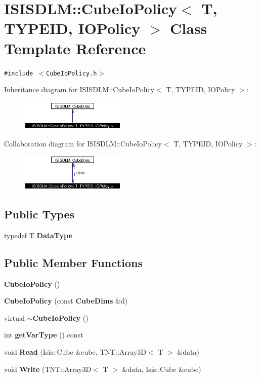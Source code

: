 \section{ISISDLM::Cube\-Io\-Policy$<$ T, TYPEID, IOPolicy $>$ Class Template Reference}
\label{classISISDLM_1_1CubeIoPolicy}
{\tt \#include $<$Cube\-Io\-Policy.h$>$}

Inheritance diagram for ISISDLM::Cube\-Io\-Policy$<$ T, TYPEID, IOPolicy $>$:\begin{figure}[H]
\begin{center}
\leavevmode
\includegraphics[width=143pt]{classISISDLM_1_1CubeIoPolicy__inherit__graph}
\end{center}
\end{figure}
Collaboration diagram for ISISDLM::Cube\-Io\-Policy$<$ T, TYPEID, IOPolicy $>$:\begin{figure}[H]
\begin{center}
\leavevmode
\includegraphics[width=143pt]{classISISDLM_1_1CubeIoPolicy__coll__graph}
\end{center}
\end{figure}
\subsection*{Public Types}
\begin{CompactItemize}
\item 
typedef T {\bf Data\-Type}
\end{CompactItemize}
\subsection*{Public Member Functions}
\begin{CompactItemize}
\item 
{\bf Cube\-Io\-Policy} ()
\item 
{\bf Cube\-Io\-Policy} (const {\bf Cube\-Dims} \&d)
\item 
virtual {\bf $\sim$Cube\-Io\-Policy} ()
\item 
int {\bf get\-Var\-Type} () const
\item 
void {\bf Read} (Isis::Cube \&cube, TNT::Array3D$<$ T $>$ \&data)
\item 
void {\bf Write} (TNT::Array3D$<$ T $>$ \&data, Isis::Cube \&cube)
\end{CompactItemize}
